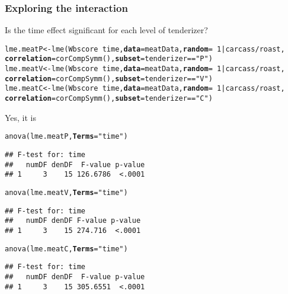 \documentclass[color=usenames,dvipsnames]{beamer}\usepackage[]{graphicx}\usepackage[]{color}
\makeatletter
\newcommand{\hlnum}[1]{\textcolor[rgb]{0.69,0.494,0}{#1}}%
\newcommand{\hlstr}[1]{\textcolor[rgb]{0.749,0.012,0.012}{#1}}%
\newcommand{\hlopt}[1]{\textcolor[rgb]{0,0,0}{#1}}%
\newcommand{\hlstd}[1]{\textcolor[rgb]{0,0,0}{#1}}%
\newcommand{\hlkwb}[1]{\textcolor[rgb]{0,0.341,0.682}{#1}}%
\newcommand{\hlkwc}[1]{\textcolor[rgb]{0,0,0}{\textbf{#1}}}%
\newcommand{\hlkwd}[1]{\textcolor[rgb]{0.004,0.004,0.506}{#1}}%
\newenvironment{kframe}{%
 \def\at@end@of@kframe{}%
 \ifinner\ifhmode%
  \def\at@end@of@kframe{\end{minipage}}%
  \begin{minipage}{\columnwidth}%
 \fi\fi%
 \def\FrameCommand##1{\hskip\@totalleftmargin \hskip-\fboxsep
 \colorbox{shadecolor}{##1}\hskip-\fboxsep
     \hskip-\linewidth \hskip-\@totalleftmargin \hskip\columnwidth}%
 \MakeFramed {\advance\hsize-\width
   \@totalleftmargin\z@ \linewidth\hsize
   \@setminipage}}%
 {\par\unskip\endMakeFramed%
 \at@end@of@kframe}
\newenvironment{knitrout}{}{} %
\makeatother
\begin{document}
\begin{frame}[fragile]
  \frametitle{Exploring the interaction}
  \small
  Is the time effect significant for each level of tenderizer?
\begin{knitrout}\tiny
{}\color{fgcolor}\begin{kframe}
\begin{alltt}
\hlstd{lme.meatP} \hlkwb{<-} \hlkwd{lme}\hlstd{(Wbscore} \hlopt{~} \hlstd{time,} \hlkwc{data}\hlstd{=meatData,} \hlkwc{random} \hlstd{=} \hlopt{~}\hlnum{1}\hlopt{|}\hlstd{carcass}\hlopt{/}\hlstd{roast,}
                 \hlkwc{correlation}\hlstd{=}\hlkwd{corCompSymm}\hlstd{(),} \hlkwc{subset}\hlstd{=tenderizer}\hlopt{==}\hlstr{"P"}\hlstd{)}
\hlstd{lme.meatV} \hlkwb{<-} \hlkwd{lme}\hlstd{(Wbscore} \hlopt{~} \hlstd{time,} \hlkwc{data}\hlstd{=meatData,} \hlkwc{random} \hlstd{=} \hlopt{~}\hlnum{1}\hlopt{|}\hlstd{carcass}\hlopt{/}\hlstd{roast,}
                 \hlkwc{correlation}\hlstd{=}\hlkwd{corCompSymm}\hlstd{(),} \hlkwc{subset}\hlstd{=tenderizer}\hlopt{==}\hlstr{"V"}\hlstd{)}
\hlstd{lme.meatC} \hlkwb{<-} \hlkwd{lme}\hlstd{(Wbscore} \hlopt{~} \hlstd{time,} \hlkwc{data}\hlstd{=meatData,} \hlkwc{random} \hlstd{=} \hlopt{~}\hlnum{1}\hlopt{|}\hlstd{carcass}\hlopt{/}\hlstd{roast,}
                 \hlkwc{correlation}\hlstd{=}\hlkwd{corCompSymm}\hlstd{(),} \hlkwc{subset}\hlstd{=tenderizer}\hlopt{==}\hlstr{"C"}\hlstd{)}
\end{alltt}
\end{kframe}
\end{knitrout}
\pause
\vfill
\small %
Yes, it is
\begin{knitrout}\tiny
{}\color{fgcolor}\begin{kframe}
\begin{alltt}
\hlkwd{anova}\hlstd{(lme.meatP,} \hlkwc{Terms}\hlstd{=}\hlstr{"time"}\hlstd{)}
\end{alltt}
\begin{verbatim}
## F-test for: time 
##   numDF denDF  F-value p-value
## 1     3    15 126.6786  <.0001
\end{verbatim}
\begin{alltt}
\hlkwd{anova}\hlstd{(lme.meatV,} \hlkwc{Terms}\hlstd{=}\hlstr{"time"}\hlstd{)}
\end{alltt}
\begin{verbatim}
## F-test for: time 
##   numDF denDF F-value p-value
## 1     3    15 274.716  <.0001
\end{verbatim}
\begin{alltt}
\hlkwd{anova}\hlstd{(lme.meatC,} \hlkwc{Terms}\hlstd{=}\hlstr{"time"}\hlstd{)}
\end{alltt}
\begin{verbatim}
## F-test for: time 
##   numDF denDF  F-value p-value
## 1     3    15 305.6551  <.0001
\end{verbatim}
\end{kframe}
\end{knitrout}

\end{frame}
\end{document}
